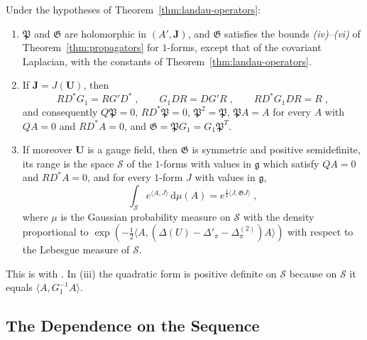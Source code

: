 \documentclass[11pt]{preprint}
\newcommand{\dd}{\mathrm{d}}
\numberwithin{equation}{section}
\begin{document}
\begin{theorem}\label{thm:fluctuation-propagator}
Under the hypotheses of Theorem~\ref{thm:landau-operators}:
\begin{enumerate}[label=(\roman*)]
\item $\mathfrak P$ and $\mathfrak G$ are holomorphic in $(A', \mathbf J)$, and $\mathfrak G$ satisfies the bounds \emph{(iv)}--\emph{(vi)} of Theorem~\ref{thm:propagators} for $1$-forms, except that of the covariant Laplacian, with the constants of Theorem~\ref{thm:landau-operators}.
\item If $\mathbf J = J(\mathbf U)$, then
\begin{equation}\label{eq:gauge-fixing-identities}
    RD^*G_1 = RG'D^*\;,
    \qquad
    G_1DR = DG'R\;,
    \qquad
    RD^*G_1DR = R\;,
\end{equation}
and consequently $Q\mathfrak P = 0$, $RD^*\mathfrak P = 0$, $\mathfrak P^2 = \mathfrak P$, $\mathfrak P A = A$ for every $A$ with $QA = 0$ and $RD^*A = 0$, and $\mathfrak G = \mathfrak PG_1 = G_1\mathfrak P^T$.
\item If moreover $\mathbf U$ is a gauge field, then $\mathfrak G$ is symmetric and positive semidefinite, its range is the space $\mathcal S$ of the $1$-forms with values in $\mathfrak g$ which satisfy $QA = 0$ and $RD^*A = 0$, and for every $1$-form $J$ with values in $\mathfrak g$,
\begin{equation}\label{eq:fluctuation-covariance}
    \int_{\mathcal S}e^{\langle A, J\rangle}\,\dd\mu(A) = e^{\frac{1}{2}\langle J, \mathfrak GJ\rangle}\;,
\end{equation}
where $\mu$ is the Gaussian probability measure on $\mathcal S$ with the density proportional to $\exp(-\frac{1}{2}\langle A, (\Delta(U) - \Delta'_\pi - \Delta^{(2)}_\pi)A\rangle)$ with respect to the Lebesgue measure of $\mathcal S$.
\end{enumerate}
\end{theorem}

This is \cite[Theorem~3.13]{BalabanPBG} with \cite[(3.147)--(3.153)]{BalabanPBG}. In (iii) the quadratic form is positive definite on $\mathcal S$ because on $\mathcal S$ it equals $\langle A, G_1^{-1}A\rangle$.

\subsection{The Dependence on the Sequence}\label{sec:change-of-sequence}
\end{document}

